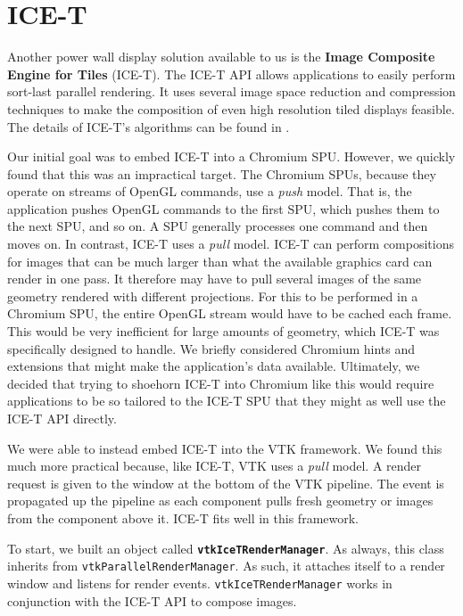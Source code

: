 \documentclass[letterpaper]{acmsiggraph}
\newcommand{\cidentifier}[1]{\texttt{#1}}
\newcommand{\keyterm}[1]{\textbf{#1}}
\begin{document}
  \section{ICE-T}
  \label{sec:ICE-T}

  Another power wall display solution available to us is the \keyterm{Image
  Composite Engine for Tiles} (ICE-T).  The ICE-T API allows applications
  to easily perform sort-last parallel rendering.  It uses several image
  space reduction and compression techniques to make the composition of
  even high resolution tiled displays feasible.  The details of ICE-T's
  algorithms can be found in \cite{Moreland01}.

  Our initial goal was to embed ICE-T into a Chromium SPU.  However, we
  quickly found that this was an impractical target.  The Chromium SPUs,
  because they operate on streams of OpenGL commands, use a \emph{push}
  model.  That is, the application pushes OpenGL commands to the first SPU,
  which pushes them to the next SPU, and so on.  A SPU generally processes
  one command and then moves on.  In contrast, ICE-T uses a \emph{pull}
  model.  ICE-T can perform compositions for images that can be much larger
  than what the available graphics card can render in one pass.  It
  therefore may have to pull several images of the same geometry rendered
  with different projections.  For this to be performed in a Chromium SPU,
  the entire OpenGL stream would have to be cached each frame.  This would
  be very inefficient for large amounts of geometry, which ICE-T was
  specifically designed to handle.  We briefly considered Chromium hints
  and extensions that might make the application's data available.
  Ultimately, we decided that trying to shoehorn ICE-T into Chromium like
  this would require applications to be so tailored to the ICE-T SPU that
  they might as well use the ICE-T API directly.

  We were able to instead embed ICE-T into the VTK framework.  We found
  this much more practical because, like ICE-T, VTK uses a \emph{pull}
  model.  A render request is given to the window at the bottom of the VTK
  pipeline.  The event is propagated up the pipeline as each component
  pulls fresh geometry or images from the component above it.  ICE-T fits
  well in this framework.

  To start, we built an object called
  \keyterm{\cidentifier{vtk\-Ice\-T\-Render\-Manager}}.  As always, this
  class inherits from \cidentifier{vtk\-Parallel\-Render\-Manager}.  As
  such, it attaches itself to a render window and listens for render
  events.  \cidentifier{vtk\-Ice\-T\-Render\-Manager} works in conjunction
  with the ICE-T API to compose images.
\end{document}

